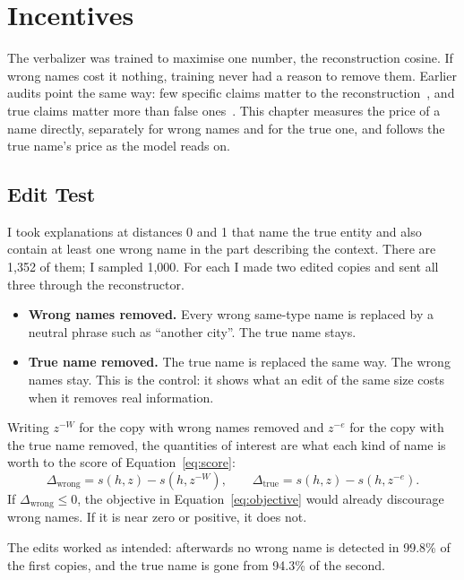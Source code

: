 \chapter{Incentives}
\label{ch:incentives}

The verbalizer was trained to maximise one number, the reconstruction cosine. If wrong names cost it
nothing, training never had a reason to remove them. Earlier audits point the same
way: few specific claims matter to the reconstruction~\cite{dingeto2026recap}, and true claims matter more than
false ones~\cite{frasertaliente2026nla}. This chapter measures the price of a name directly, separately for
wrong names and for the true one, and follows the true name's price as the model reads on.

\section{Edit Test}

I took explanations at distances 0 and 1 that name the true entity and also contain at least one wrong name
in the part describing the context. There are 1{,}352 of them; I sampled 1{,}000. For each I made two edited
copies and sent all three through the reconstructor.

\begin{itemize}
\item \textbf{Wrong names removed.} Every wrong same-type name is replaced by a neutral phrase such as
``another city''. The true name stays.
\item \textbf{True name removed.} The true name is replaced the same way. The wrong names stay. This is the
control: it shows what an edit of the same size costs when it removes real information.
\end{itemize}

Writing $z^{-W}$ for the copy with wrong names removed and $z^{-e}$ for the copy with the true name removed,
the quantities of interest are what each kind of name is worth to the score of Equation~\ref{eq:score}:
\begin{equation}
\Delta_{\text{wrong}} = s(h,z) - s(h,z^{-W}), \qquad \Delta_{\text{true}} = s(h,z) - s(h,z^{-e}).
\label{eq:delta}
\end{equation}
If $\Delta_{\text{wrong}} \le 0$, the objective in Equation~\ref{eq:objective} would already discourage wrong
names. If it is near zero or positive, it does not.

The edits worked as intended: afterwards no wrong name is detected in 99.8\% of the first copies, and the
true name is gone from 94.3\% of the second.

